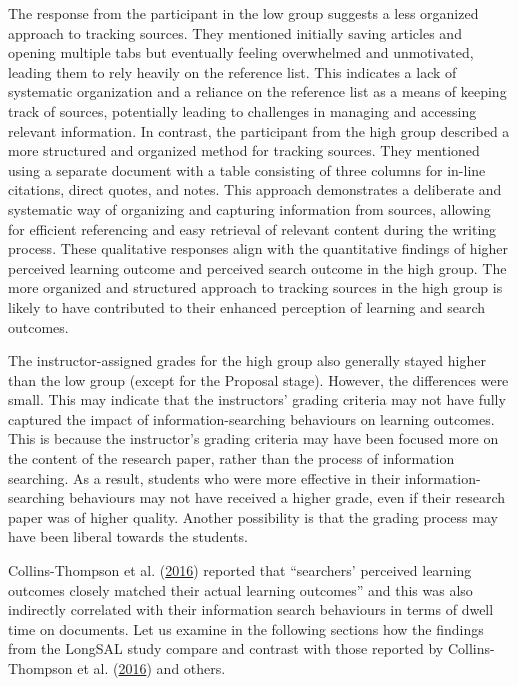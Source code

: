 \documentclass[letterpaper, nobind]{templates/ociamthesis}
\begin{document}
The response from the participant in the low group suggests a less organized approach to tracking sources. They mentioned initially saving articles and opening multiple tabs but eventually feeling overwhelmed and unmotivated, leading them to rely heavily on the reference list. This indicates a lack of systematic organization and a reliance on the reference list as a means of keeping track of sources, potentially leading to challenges in managing and accessing relevant information.
In contrast, the participant from the high group described a more structured and organized method for tracking sources. They mentioned using a separate document with a table consisting of three columns for in-line citations, direct quotes, and notes. This approach demonstrates a deliberate and systematic way of organizing and capturing information from sources, allowing for efficient referencing and easy retrieval of relevant content during the writing process.
These qualitative responses align with the quantitative findings of higher perceived learning outcome and perceived search outcome in the high group. The more organized and structured approach to tracking sources in the high group is likely to have contributed to their enhanced perception of learning and search outcomes.

The instructor-assigned grades for the high group also generally stayed higher than the low group (except for the Proposal stage). However, the differences were small.
This may indicate that the instructors' grading criteria may not have fully captured the impact of information-searching behaviours on learning outcomes.
This is because the instructor's grading criteria may have been focused more on the content of the research paper, rather than the process of information searching. As a result, students who were more effective in their information-searching behaviours may not have received a higher grade, even if their research paper was of higher quality.
Another possibility is that the grading process may have been liberal towards the students.

Collins-Thompson et al. (\protect\hyperlink{ref-collins2016assessing}{2016}) reported that ``searchers' perceived learning outcomes closely matched their actual learning outcomes'' and this was also indirectly correlated with their information search behaviours in terms of dwell time on documents.
Let us examine in the following sections how the findings from the LongSAL study compare and contrast with those reported by Collins-Thompson et al. (\protect\hyperlink{ref-collins2016assessing}{2016}) and others.
\end{document}
